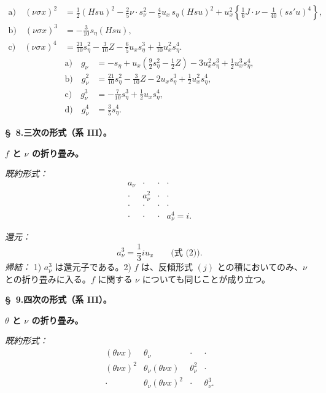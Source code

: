 \documentclass[11pt]{article}
\begin{document}
\[
\tag{7}
\begin{aligned}
\text{a)}\quad (\nu\sigma x)^2
&=\frac12(Hsu)^2-\frac25\nu\cdot s_\nu^2-
\frac45u_x\,s_\eta(Hsu)^2
+u_x^2\left\{\frac16J\cdot\nu-\frac1{40}(ss'u)^4\right\},\\
\text{b)}\quad (\nu\sigma x)^3&=-\frac3{10}s_\eta(Hsu),\\
\text{c)}\quad (\nu\sigma x)^4&=\frac{21}{10}s_\eta^2-\frac3{10}Z-
\frac65u_xs_\eta^3+\frac1{10}u_x^2s_\eta^4.
\end{aligned}
\]
\[
\tag{8}
\begin{aligned}
\text{a)}\quad g_\nu&=-s_\eta+u_x\left(\frac92s_\eta^2-\frac12Z\right)-3u_x^2s_\eta^3+\frac12u_x^3s_\eta^4,\\
\text{b)}\quad g_\nu^2&=\frac{21}{10}s_\eta^2-\frac3{10}Z-2u_xs_\eta^3+\frac12u_x^2s_\eta^4,\\
\text{c)}\quad g_\nu^3&=-\frac7{10}s_\eta^3+\frac12u_xs_\eta^4,\\
\text{d)}\quad g_\nu^4&=\frac35s_\eta^4.
\end{aligned}
\]

\begin{center}
\textbf{\S\ 8.\quad 三次の形式（系 III）。}
\end{center}

\noindent\textbf{$f$ と $\nu$ の折り畳み。}

\noindent\emph{既約形式：}
\[
\begin{array}{cccc}
a_\nu&\cdot&\cdot&\cdot\\
\cdot&a_\nu^2&\cdot&\cdot\\
\cdot&\cdot&\cdot&\cdot\\
\cdot&\cdot&\cdot&a_\nu^4=i.
\end{array}
\]

\noindent\emph{還元：}
\[
a_\nu^3=\frac13 i u_x\qquad\text{(式 (2)).}
\]
\noindent\emph{帰結：} 1) $a_\nu^3$ は還元子である。2) $f$ は、反傾形式 $(j)$ との積においてのみ、$\nu$ との折り畳みに入る。$f$ に関する $\nu$ についても同じことが成り立つ。

\begin{center}
\textbf{\S\ 9.\quad 四次の形式（系 III）。}
\end{center}

\noindent\textbf{$\theta$ と $\nu$ の折り畳み。}

\noindent\emph{既約形式：}
\[
\begin{array}{cccc}
(\theta\nu x)&\theta_\nu&\cdot&\cdot\\
(\theta\nu x)^2&\theta_\nu(\theta\nu x)&\theta_\nu^2&\cdot\\
\cdot&\theta_\nu(\theta\nu x)^2&\cdot&\theta_\nu^3.
\end{array}
\]
\end{document}
